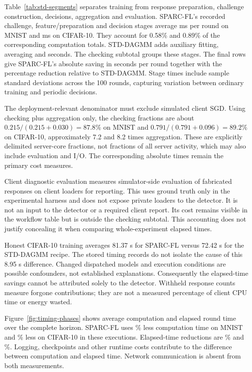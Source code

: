 \documentclass[journal]{IEEEtran}
\begin{document}
Table~\ref{tab:std-segments} separates training from response preparation,
challenge construction, decisions, aggregation and evaluation. SPARC-FL's
recorded challenge, feature/preparation and decision stages average
\TimingMnistAuditingMs{} ms per round on MNIST and
\TimingCifarAuditingMs{} ms on CIFAR-10. They account for 0.58\% and
0.89\% of the corresponding computation totals. STD-DAGMM adds auxiliary
fitting, averaging \TimingMnistFitting{} and \TimingCifarFitting{} seconds.
The checking subtotal groups these stages. The final rows give SPARC-FL's
absolute saving in seconds per round together with the percentage
reduction relative to STD-DAGMM. Stage times include sample standard
deviations across the 100 rounds, capturing variation between ordinary
training and periodic decisions.

The deployment-relevant denominator must exclude simulated client SGD.
Using checking plus aggregation only, the checking fractions are about
$0.215/(0.215+0.030)=87.8\%$ on MNIST and
$0.791/(0.791+0.096)=89.2\%$ on CIFAR-10, approximately 7.2 and 8.2 times
aggregation. These are explicitly delimited server-core fractions, not
fractions of all server activity, which may also include evaluation and
I/O. The corresponding absolute times remain the primary cost measures.

Client diagnostic evaluation measures simulator-side evaluation of fabricated
responses on client loaders for reporting. This uses ground truth only in the
experimental harness and does not expose private loaders to the detector.
It is not an input to the detector or a required
client report. Its cost remains visible in the workflow table but is
outside the checking subtotal. This accounting does not justify concealing
it when comparing whole-experiment elapsed times.

Honest CIFAR-10 training averages 81.37 s for SPARC-FL versus 72.42 s for
the STD-DAGMM recipe. The stored timing records do not isolate the cause
of this 8.95 s difference. Changed dispatched models and execution
conditions are possible confounders, not established explanations.
Consequently the elapsed-time savings cannot be attributed solely to the
detector. Withheld response counts measure forgone contributions; they
are not a measured percentage of client CPU time or energy wasted.

Figure~\ref{fig:timing-phases} shows average
computation and elapsed round time over the complete horizon. SPARC-FL uses
\TimingMnistReduction\% less computation time on MNIST and
\TimingCifarReduction\% less on CIFAR-10 in these executions. Elapsed-time
reductions are \TimingMnistWallReduction\% and
\TimingCifarWallReduction\%. Logging, checkpoints and other runtime costs
contribute to the difference between computation and elapsed time. Network
communication is absent from both measurements.


\end{document}

